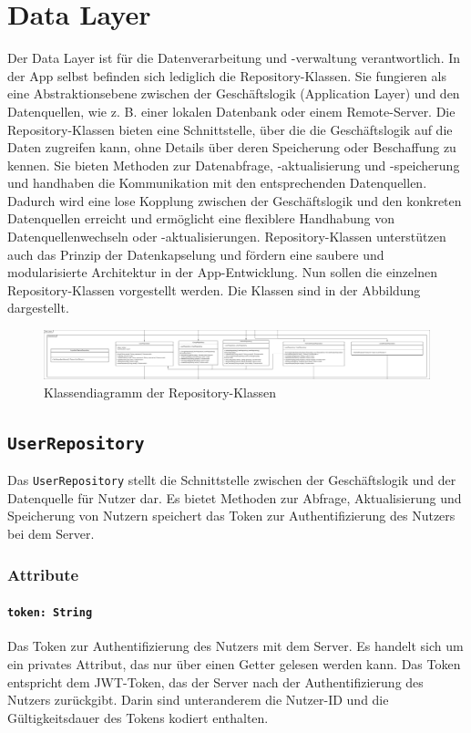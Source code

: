 \documentclass{entwurfsheft}
\begin{document}
\newpage
\section{Data Layer}
Der Data Layer ist für die Datenverarbeitung und -verwaltung verantwortlich. In der App selbst befinden sich lediglich die Repository-Klassen. Sie fungieren als eine Abstraktionsebene zwischen der Geschäftslogik (Application Layer) und den Datenquellen, wie z. B. einer lokalen Datenbank oder einem Remote-Server. Die Repository-Klassen bieten eine Schnittstelle, über die die Geschäftslogik auf die Daten zugreifen kann, ohne Details über deren Speicherung oder Beschaffung zu kennen. Sie bieten Methoden zur Datenabfrage, -aktualisierung und -speicherung und handhaben die Kommunikation mit den entsprechenden Datenquellen. Dadurch wird eine lose Kopplung zwischen der Geschäftslogik und den konkreten Datenquellen erreicht und ermöglicht eine flexiblere Handhabung von Datenquellenwechseln oder -aktualisierungen. Repository-Klassen unterstützen auch das Prinzip der Datenkapselung und fördern eine saubere und modularisierte Architektur in der App-Entwicklung.
Nun sollen die einzelnen Repository-Klassen vorgestellt werden. Die Klassen sind in der Abbildung dargestellt.
\begin{figure}[htp]
    \centering
    \includegraphics[width=\textwidth]{images/dataLayer/dataLayer.pdf}
    \caption{Klassendiagramm der Repository-Klassen}
    \label{fig:dataLayer}
\end{figure}
\newpage
\subsection{\texttt{UserRepository}}\label{sec:userrepository}
Das \texttt{UserRepository} stellt die Schnittstelle zwischen der Geschäftslogik und der Datenquelle für Nutzer dar. Es bietet Methoden zur Abfrage, Aktualisierung und Speicherung von Nutzern speichert das Token zur Authentifizierung des Nutzers bei dem Server.
\subsubsection*{Attribute}
\paragraph{\texttt{token: String}}
Das Token zur Authentifizierung des Nutzers mit dem Server. Es handelt sich um ein privates Attribut, das nur über einen Getter gelesen werden kann. Das Token entspricht dem JWT-Token, das der Server nach der Authentifizierung des Nutzers zurückgibt. Darin sind unteranderem die Nutzer-ID und die Gültigkeitsdauer des Tokens kodiert enthalten.
\end{document}
